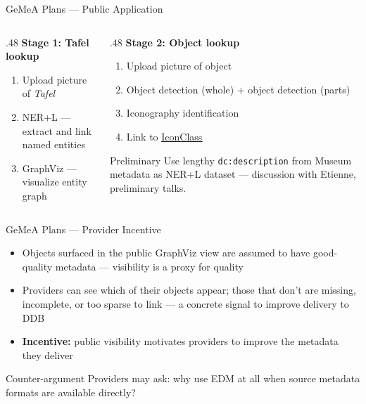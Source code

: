 \documentclass[xcolor,aspectratio=169,compress]{beamer}
\newcommand{\lnk}[2]{\href{#1}{\underline{#2}}}
\begin{document}
\begin{frame}{GeMeA Plans --- Public Application}
  \small
  \begin{columns}[t]
    \begin{column}{.48\textwidth}
      \textbf{Stage 1: Tafel lookup}
      \begin{enumerate}\setlength{\itemsep}{4pt}
        \item Upload picture of \textit{Tafel}
        \item NER+L --- extract and link named entities
        \item GraphViz --- visualize entity graph
      \end{enumerate}
    \end{column}
    \begin{column}{.48\textwidth}
      \textbf{Stage 2: Object lookup}
      \begin{enumerate}\setlength{\itemsep}{4pt}
        \item Upload picture of object
        \item Object detection (whole) + object detection (parts)
        \item Iconography identification
        \item Link to \lnk{https://iconclass.org/}{IconClass}
      \end{enumerate}
      \smallskip
      \begin{block}{\footnotesize Preliminary}
        \footnotesize Use lengthy \texttt{dc:description} from Museum metadata as NER+L
        dataset --- discussion with Etienne, preliminary talks.
      \end{block}
    \end{column}
  \end{columns}
\end{frame}

\begin{frame}{GeMeA Plans --- Provider Incentive}
  \small
  \begin{itemize}\setlength{\itemsep}{6pt}
    \item Objects surfaced in the public GraphViz view are assumed to have good-quality metadata ---
          visibility is a proxy for quality
    \item Providers can see which of their objects appear; those that don't are missing, incomplete,
          or too sparse to link --- a concrete signal to improve delivery to DDB
    \item \textbf{Incentive:} public visibility motivates providers to improve the metadata
          they deliver
  \end{itemize}

  \medskip
  \begin{alertblock}{Counter-argument}
    \small Providers may ask: why use EDM at all when source metadata formats are available directly?
  \end{alertblock}
\end{frame}

\end{document}
